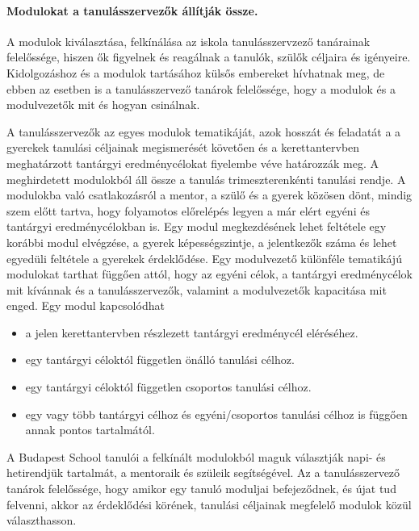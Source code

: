 \paragraph{Modulokat a tanulásszervezők állítják össze.}

A modulok kiválasztása, felkínálása az iskola tanulásszervzező tanárainak felelőssége, hiszen ők figyelnek és reagálnak a tanulók, szülők céljaira és igényeire. Kidolgozáshoz és a modulok tartásához külsős embereket hívhatnak meg, de ebben az esetben is a tanulásszervező tanárok felelőssége, hogy a modulok és a modulvezetők mit és hogyan csinálnak.

A tanulásszervezők az egyes modulok tematikáját, azok hosszát és feladatát a a gyerekek tanulási céljainak megismerését követően és a kerettantervben meghatárzott tantárgyi eredménycélokat fiyelembe véve határozzák meg. A meghirdetett modulokból áll össze a tanulás trimeszterenkénti tanulási rendje. A modulokba való csatlakozásról a mentor, a szülő és a gyerek közösen dönt, mindig szem előtt tartva, hogy folyamotos előrelépés legyen a már elért egyéni és tantárgyi eredménycélokban is. Egy modul megkezdésének lehet feltétele egy korábbi modul elvégzése, a gyerek képességszintje, a jelentkezők száma és lehet egyedüli feltétele a gyerekek érdeklődése. Egy modulvezető különféle tematikájú modulokat tarthat függően attól, hogy az egyéni célok, a tantárgyi eredménycélok mit kívánnak és a tanulásszervezők, valamint a modulvezetők kapacitása mit enged. Egy modul kapcsolódhat

   \begin{itemize}

\item  a jelen kerettantervben részlezett tantárgyi eredménycél eléréséhez.
\item egy tantárgyi céloktól független önálló tanulási célhoz.
\item egy tantárgyi céloktól független csoportos tanulási célhoz.
\item egy vagy több tantárgyi célhoz és egyéni/csoportos tanulási célhoz is függően annak pontos tartalmától.
\end{itemize}

A Budapest School tanulói a felkínált modulokból maguk választják napi- és hetirendjük tartalmát, a mentoraik és szüleik segítségével. Az a tanulásszervező tanárok felelőssége, hogy amikor egy tanuló moduljai befejeződnek, és újat tud felvenni, akkor az érdeklődési körének, tanulási céljainak megfelelő modulok közül választhasson.

